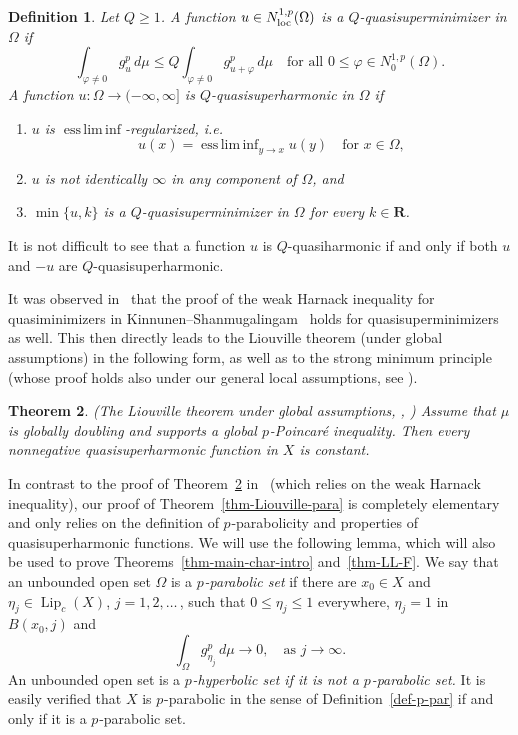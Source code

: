 \documentclass[a4paper,twoside]{article}
\theoremstyle{propositional}
\newtheorem{thm}{Theorem}[section]
\theoremstyle{descriptive}
\newtheorem{deff}[thm]{Definition}
\theoremstyle{remarkstyle}
\DeclareMathOperator{\Lip}{Lip}
\DeclareMathOperator*{\essliminf}{ess\,lim\,inf}
\newcommand{\loc}{_{\rm loc}}
\newcommand{\Om}{\Omega}
\renewcommand{\phi}{\varphi}
\newcommand{\p}{{$p\mspace{1mu}$}}
\newcommand{\R}{\mathbf{R}}
\newcommand{\Np}{N^{1,p}}
\newcommand{\Nploc}{N^{1,p}\loc}
\numberwithin{equation}{section}
\begin{document}
\begin{deff} \label{deff-quasisuperharm}
Let $Q \ge 1$.
A function $u \in \Nploc(\Om)$ is a
\emph{$Q$-quasisuperminimizer}
in $\Om$ if 
\[ 
      \int_{\phi \ne 0} g^p_u \, d\mu
           \le Q \int_{\phi \ne 0} g_{u+\phi}^p \, d\mu
           \quad \text{for all } 0 \le \phi \in \Np_0(\Om).
\] 
A function $u:\Om \to (-\infty,\infty]$ 
is  \emph{$Q$-quasisuperharmonic} in $\Om$
if 
\begin{enumerate}
\item 
$u$ is \emph{$\essliminf$-regularized}, i.e.\
\begin{equation} \label{eq-essliminf-reg}
u(x)=\essliminf_{y \to x} u(y) \quad \text{for } x \in \Om,
\end{equation}
\item 
 $u$ is not identically $\infty$ in any component of $\Om$, and
\item 
$\min\{u,k\}$ is a $Q$-quasisuperminimizer in $\Om$ for
every $k \in \R$.
\end{enumerate}
\end{deff}

It is not difficult to see that a function $u$ is $Q$-quasiharmonic 
if and only if 
both $u$ and $-u$ are $Q$-quasisuperharmonic.


It was observed in~\cite{KiMa03} that the proof
of the weak Harnack inequality for quasiminimizers in
Kinnunen--Shan\-mu\-ga\-lin\-gam~\cite{KiSh01} holds for 
quasisuperminimizers as well. 
This then directly leads to the Liouville theorem
(under global assumptions) 
in the following form, as well as to
the strong minimum principle
(whose proof holds also under our general local assumptions,
see \cite[Section~10]{BBsemilocal}). 

\begin{thm} \label{thm-Liouville-global}
\textup{(The Liouville theorem under global assumptions,
\cite{KiMa03}, \cite{KiSh01})}
Assume that $\mu$ is globally doubling and supports a global \p-Poincar\'e
inequality.
Then every  nonnegative quasisuperharmonic function in $X$ is constant.
\end{thm}

In contrast to the proof of
Theorem~\ref{thm-Liouville-global} in~\cite{KiSh01}
(which relies on the weak Harnack inequality),
our proof of Theorem~\ref{thm-Liouville-para}
is completely elementary and only relies on the
definition of \p-parabolicity and 
properties of 
quasisuperharmonic functions.
We will use the 
following lemma, which will also be used 
to prove Theorems~\ref{thm-main-char-intro} 
and~\ref{thm-LL-F}.
We say that an unbounded open set $\Om$ is a \emph{\p-parabolic set} if 
there are $x_0 \in X$ and $\eta_j \in \Lip_c(X)$, $j=1,2,\dots$\,,
such that $0\le \eta_j \le1$ everywhere,
$\eta_j=1$ in $B(x_0,j)$ and 
\begin{equation}   \label{eq-par-set-int}
\int_\Om g_{\eta_j}^p \,d\mu \to 0, \quad \text{as } j\to\infty.
\end{equation}
An unbounded open set is a  \emph{\p-hyperbolic set
if it is not a \p-parabolic set.}
It is easily verified that $X$ is \p-parabolic in the sense 
of Definition~\ref{def-p-par} if and only if it is a \p-parabolic set.
\end{document}

